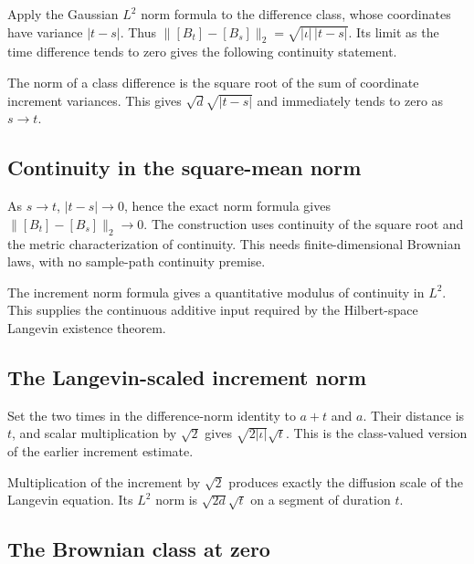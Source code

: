 \documentclass[11pt,a4paper]{report}
\begin{document}
Apply the Gaussian \(L^2\) norm formula to the difference class, whose coordinates have variance \(|t-s|\). Thus \(\|[B_t]-[B_s]\|_2=\sqrt{|\iota|\,|t-s|}\). Its limit as the time difference tends to zero gives the following continuity statement.



The norm of a class difference is the square root of the sum of coordinate increment variances. This gives \(\sqrt d\sqrt{|t-s|}\) and immediately tends to zero as \(s\to t\).

\subsection{\texorpdfstring{Continuity in the square-mean norm}{Continuity in the square-mean norm}}
\label{report-step-UnadjustedLangevin-GaussianCoordinates-lean-18}


As \(s\to t\), \(|t-s|\to0\), hence the exact norm formula gives \(\|[B_t]-[B_s]\|_2\to0\). The construction uses continuity of the square root and the metric characterization of continuity. This needs finite-dimensional Brownian laws, with no sample-path continuity premise.



The increment norm formula gives a quantitative modulus of continuity in \(L^2\). This supplies the continuous additive input required by the Hilbert-space Langevin existence theorem.

\subsection{\texorpdfstring{The Langevin-scaled increment norm}{The Langevin-scaled increment norm}}
\label{report-step-UnadjustedLangevin-GaussianCoordinates-lean-19}


Set the two times in the difference-norm identity to \(a+t\) and \(a\). Their distance is \(t\), and scalar multiplication by \(\sqrt2\) gives \(\sqrt{2|\iota|}\sqrt t\). This is the class-valued version of the earlier increment estimate.



Multiplication of the increment by \(\sqrt2\) produces exactly the diffusion scale of the Langevin equation. Its \(L^2\) norm is \(\sqrt{2d}\sqrt t\) on a segment of duration \(t\).

\subsection{\texorpdfstring{The Brownian class at zero}{The Brownian class at zero}}
\label{report-step-UnadjustedLangevin-GaussianCoordinates-lean-20}
\end{document}
